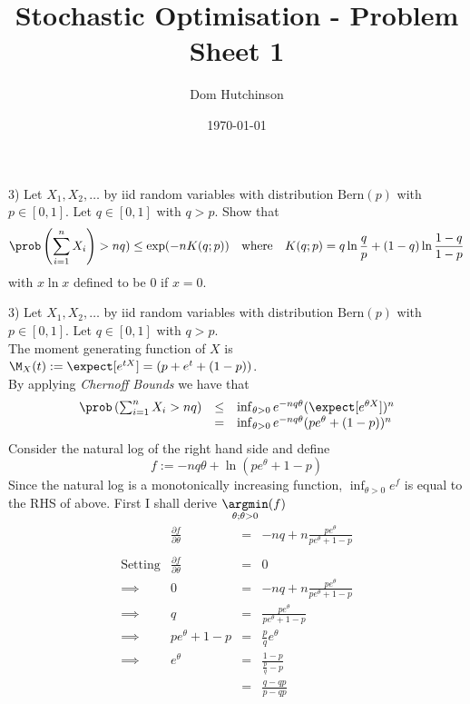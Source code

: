 \documentclass[11pt,a4paper]{article}
\begin{document}
\questionsfalse

\title{Stochastic Optimisation - Problem Sheet 1}
\author{Dom Hutchinson}
\date{\today}
\maketitle


\begin{question}{3)}
  Let $X_1,X_2,\dots$ by iid random variables with distribution $\text{Bern}(p)$ with $p\in[0,1]$. Let $q\in[0,1]$ with $q>p$. Show that
  \[ \prob\left(\sum_{i=1}^nX_i\right)>nq)\leq\text{exp}(-nK(q;p))\quad\text{where}\quad K(q;p)=q\ln\frac{q}p+(1-q)\ln\frac{1-q}{1-p} \]
  with $x\ln x$ defined to be $0$ if $x=0$.
\end{question}

\begin{answer}{3)}
  Let $X_1,X_2,\dots$ by iid random variables with distribution $\text{Bern}(p)$ with $p\in[0,1]$. Let $q\in[0,1]$ with $q>p$.\\
  The moment generating function of $X$ is $\M_X(t):=\expect[e^{tX}]=(p+e^t+(1-p))$.\\
  By applying \textit{Chernoff Bounds} we have that
  \[\begin{array}{rcl}
    \prob\left(\sum_{i=1}^nX_i>nq\right)&\leq&\inf_{\theta>0}e^{-nq\theta}(\expect[e^{\theta X}])^n\\
    &=&\inf_{\theta>0}e^{-nq\theta}(pe^\theta+(1-p))^n
  \end{array}\]
  Consider the natural log of the right hand side and define \[f:=-nq\theta+\ln(pe^\theta+1-p) \]
  Since the natural log is a monotonically increasing function, $\inf_{\theta>0}e^f$ is equal to the RHS of above.
  First I shall derive $\underset{\theta;\theta>0}\argmin (f)$
  \[\begin{array}{rrcl}
    &\frac{\partial f}{\partial\theta}&=&-nq+n\frac{pe^\theta}{pe^\theta+1-p}\\\\
    \text{Setting}&\frac{\partial f}{\partial\theta}&=&0\\
    \implies&0&=&-nq+n\frac{pe^\theta}{pe^\theta+1-p}\\
    \implies&q&=&\frac{pe^\theta}{pe^\theta+1-p}\\
    \implies&pe^\theta+1-p&=&\frac{p}qe^\theta\\
    \implies&e^\theta&=&\frac{1-p}{\frac{p}q-p}\\
    &&=&\frac{q-qp}{p-qp}\\

\end{array}\]
\end{answer}
\end{document}

